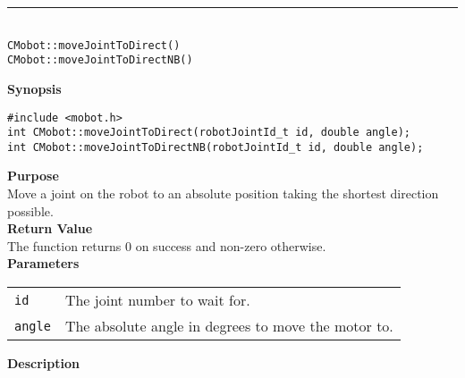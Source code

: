 \noindent
\vspace{5pt}
\rule{4.5in}{0.015in}\\
\noindent
{\LARGE \texttt{CMobot::moveJointToDirect()}}\\
{\LARGE \texttt{CMobot::moveJointToDirectNB()}}\\
{}

\noindent
{\bf Synopsis}
\vspace{-8pt}
\begin{verbatim}
#include <mobot.h>
int CMobot::moveJointToDirect(robotJointId_t id, double angle);
int CMobot::moveJointToDirectNB(robotJointId_t id, double angle);
\end{verbatim}

\noindent
{\bf Purpose}\\
Move a joint on the robot to an absolute position taking the shortest direction possible.\\

\noindent
{\bf Return Value}\\
The function returns 0 on success and non-zero otherwise.\\

\noindent
{\bf Parameters}\\
\vspace{-0.1in}
\begin{description}
\item               
\begin{tabular}{p{10 mm}p{145 mm}}
\texttt{id} & The joint number to wait for. \\
\texttt{angle} & The absolute angle in degrees to move the motor to.  \\
\end{tabular}
\end{description}

\noindent
{\bf Description}\\
\vspace{-12pt}

